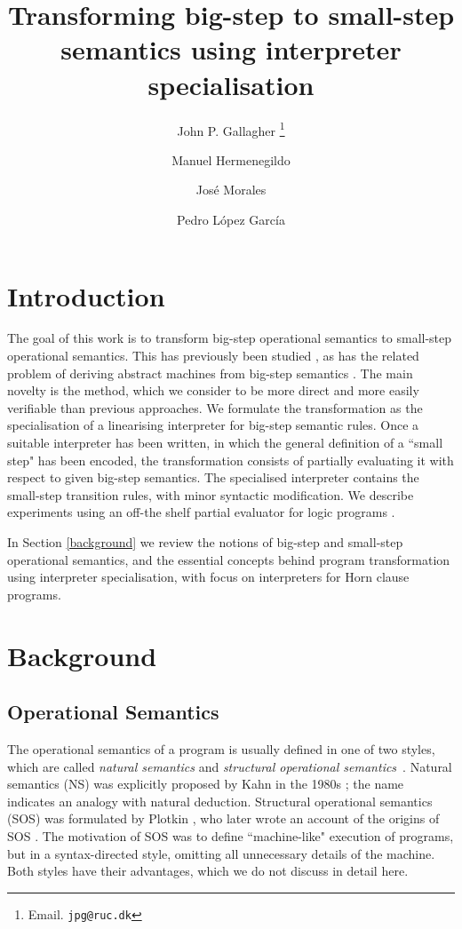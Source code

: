 \documentclass{llncs}
\title{Transforming big-step to small-step semantics using interpreter specialisation}
\author{John P. Gallagher \thanks{Email. \texttt{jpg@ruc.dk}}\inst{1}\inst{2}
\and
Manuel Hermenegildo\inst{2}  \and Jos\'e Morales
\inst{2} \and Pedro L\'opez Garc\'ia\inst{2} 
}
\institute{Roskilde University, Denmark
\and
IMDEA Software Institute, Madrid, Spain}
\begin{document}
\maketitle


\pagestyle{plain}
\pagestyle{myheadings}

\section{Introduction}

The goal of this work is to transform big-step operational semantics to small-step operational semantics.
This has previously been studied \cite{Vesely-Fisher,Hulzing,Ambal}, as has the related problem of deriving abstract
machines from big-step semantics \cite{Ager}. The main novelty is the method, which we consider to be more
direct and more easily verifiable than previous approaches.  We formulate the transformation as the specialisation of a
linearising interpreter for big-step semantic rules.  Once a suitable interpreter has been written, in which the general
definition of a ``small step" has been encoded, the transformation
consists of partially evaluating it with respect to given big-step semantics.  The specialised interpreter contains the 
small-step transition rules, 
with minor syntactic modification. We describe experiments using an off-the shelf partial evaluator 
for logic programs \cite{Logen}.

In Section \ref{background} we review the notions of big-step and small-step operational semantics, and
the essential concepts behind program transformation using interpreter specialisation, with focus on interpreters for
Horn clause programs.

\section{Background}

\subsection{Operational Semantics}
The operational semantics of a program is usually defined in one of two styles, 
which are called \emph{natural semantics} and \emph{structural operational semantics}~\cite{NielsonN1992}.
Natural semantics (NS) was explicitly proposed by Kahn in the 
1980s \cite{Kahn87}; the name indicates an analogy with natural deduction. 
Structural operational semantics (SOS) was formulated by Plotkin \cite{Plotkin1981,Plotkin04a}, 
who later wrote an account of the origins of SOS \cite{Plotkin04}.  The motivation of SOS was to define
``machine-like" execution of programs, but in a syntax-directed style, omitting all unnecessary details of
the machine.  Both styles have their advantages, which we do not discuss in detail here.
\end{document}

